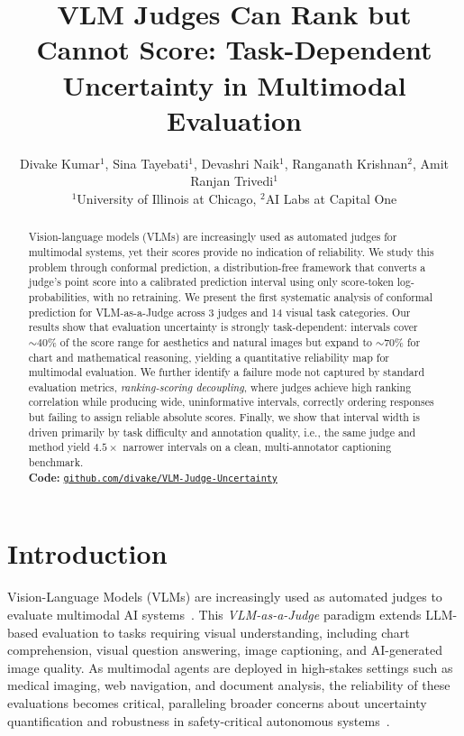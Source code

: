 \documentclass{article}
\title{VLM Judges Can Rank but Cannot Score: Task-Dependent Uncertainty in Multimodal Evaluation}
\author{Divake Kumar$^{1}$, Sina Tayebati$^{1}$, Devashri Naik$^{1}$, Ranganath Krishnan$^{2}$, Amit Ranjan Trivedi$^{1}$ \\[4pt]
$^{1}$University of Illinois at Chicago, $^{2}$AI Labs at Capital One
}
\begin{document}
\ifcolmsubmission
\linenumbers
\fi

\maketitle

\begin{abstract}
Vision-language models (VLMs) are increasingly used as automated judges for multimodal systems, yet their scores provide no indication of reliability. We study this problem through conformal prediction, a distribution-free framework that converts a judge's point score into a calibrated prediction interval using only score-token log-probabilities, with no retraining. 
We present the first systematic analysis of conformal prediction for VLM-as-a-Judge across 3 judges and 14 visual task categories. Our results show that evaluation uncertainty is strongly task-dependent: intervals cover $\sim 40\%$ of the score range for aesthetics and natural images but expand to $\sim 70\%$ for chart and mathematical reasoning, yielding a quantitative reliability map for multimodal evaluation. 
We further identify a failure mode not captured by standard evaluation metrics, \emph{ranking-scoring decoupling}, where judges achieve high ranking correlation while producing wide, uninformative intervals, correctly ordering responses but failing to assign reliable absolute scores. 
Finally, we show that interval width is driven primarily by task difficulty and annotation quality, i.e., the same judge and method yield $4.5\times$ narrower intervals on a clean, multi-annotator captioning benchmark. \\[4pt]
\textbf{Code:} \href{https://github.com/divake/VLM-Judge-Uncertainty}{\texttt{github.com/divake/VLM-Judge-Uncertainty}}
\end{abstract}

\section{Introduction}
\label{sec:intro}

Vision-Language Models (VLMs) are increasingly used as automated judges to evaluate multimodal AI systems~\citep{chen2024mllmasajudge,li2024vlrewardbench}. This \emph{VLM-as-a-Judge} paradigm extends LLM-based evaluation to tasks requiring visual understanding, including chart comprehension, visual question answering, image captioning, and AI-generated image quality. As multimodal agents are deployed in high-stakes settings such as medical imaging, web navigation, and document analysis, the reliability of these evaluations becomes critical, paralleling broader concerns about uncertainty quantification and robustness in safety-critical autonomous systems~\citep{trivedi2025sensing,darabi2024navigating,darabi2025intact,poggi2026depth,naik2026belief}.
\end{document}
